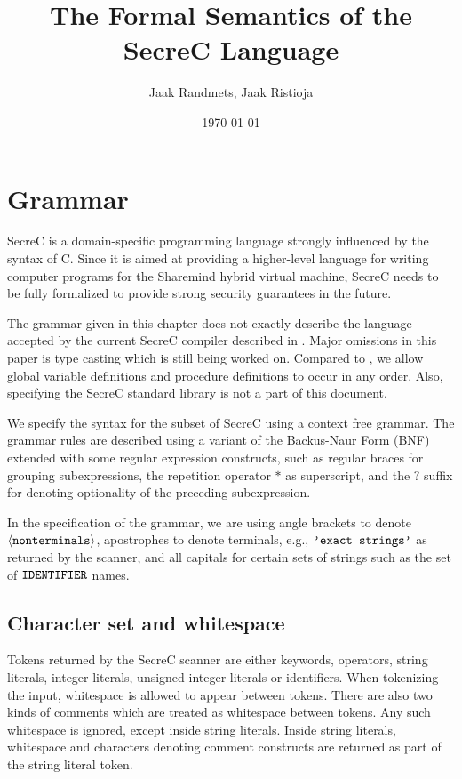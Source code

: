 \documentclass[a4paper, 10pt, draft]{report}
\title{The Formal Semantics of the SecreC Language}
\date{\today}
\author{{Jaak Randmets}, {Jaak Ristioja}}
\newcommand{\litQuote}[1]{\textcolor{black}{\texttt{'#1'}}}
\newcommand{\bnfNT}[1]{\ensuremath{\mathbf{\left\langle\mbox{\texttt{#1}}\right\rangle}}}
\newcommand{\bnfT}[1]{\ensuremath{\mbox{\litQuote{#1}}}}
\newcommand{\bnfM}[1]{\ensuremath{\mbox{\textcolor{black}{\texttt{\uppercase{#1}}}}}} %
\begin{document}
\maketitle

\newpage
\chapter{Grammar}\label{sec:grammar}

SecreC is a domain-specific programming language strongly influenced by the
syntax of C. Since it is aimed at providing a higher-level language for writing
computer programs for the Sharemind hybrid virtual machine, SecreC needs to be
fully formalized to provide strong security guarantees in the future.

The grammar given in this chapter does not exactly describe the language
accepted by the current SecreC compiler described in \cite{SECREC}. Major
omissions in this paper is type casting which is still being worked on.
Compared to \cite{SECREC}, we allow global variable definitions and procedure
definitions to occur in any order. Also, specifying the SecreC standard library
is not a part of this document.

We specify the syntax for the subset of SecreC using a context free grammar.
The grammar rules are described using a variant of the Backus-Naur Form (BNF)
extended with some regular expression constructs, such as regular braces for
grouping subexpressions, the repetition operator $*$ as superscript, and the
$?$ suffix for denoting optionality of the preceding subexpression.

In the specification of the grammar, we are using angle brackets to denote
\bnfNT{nonterminals}, apostrophes to denote terminals, e.g., \bnfT{exact
strings} as returned by the scanner, and all capitals for certain sets of
strings such as the set of \bnfM{IDENTIFIER} names.

\section{Character set and whitespace}\label{sec:grammar:chars}

Tokens returned by the SecreC scanner are either keywords, operators, string
literals, integer literals, unsigned integer literals or identifiers. When
tokenizing the input, whitespace is allowed to appear between tokens. There are
also two kinds of comments which are treated as whitespace between tokens. Any
such whitespace is ignored, except inside string literals. Inside string
literals, whitespace and characters denoting comment constructs are returned as
part of the string literal token.
\end{document}
